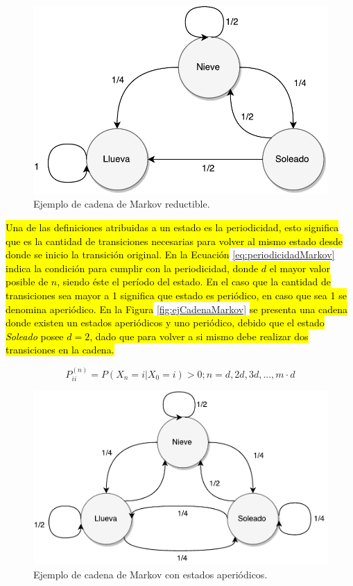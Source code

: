 \begin{figure}[ht!]
	\centering
	\includegraphics[scale=0.5]{images/EjCadenaMarkov-Reductible.pdf}
	\caption{Ejemplo de cadena de Markov reductible.}
	\label{fig:ejCadenaMarkov-Reductible}
\end{figure}

\hl{Una de las definiciones atribuidas a un estado es la periodicidad, esto significa que es la cantidad de transiciones necesarias para volver al mismo estado desde donde se inicio la transición original. En la Ecuación} \ref{eq:periodicidadMarkov} \hl{indica la condición para cumplir con la periodicidad, donde $d$ el mayor valor posible de $n$, siendo éste el período del estado. En el caso que la cantidad de transiciones sea mayor a 1 significa que estado es periódico, en caso que sea 1 se denomina aperiódico. En la Figura} \ref{fig:ejCadenaMarkov} \hl{se presenta una cadena donde existen un estados aperiódicos y uno periódico, debido que el estado \textit{Soleado} posee $d=2$, dado que para volver a si mismo debe realizar dos transiciones en la cadena.}

\begin{equation} \label{eq:periodicidadMarkov}
	P_{ii}^{(n)} = P(X_n = i | X_0 = i) > 0 ; n = {d,2d,3d,..., m·d}
\end{equation}

\begin{figure}[ht!]
	\centering
	\includegraphics[scale=0.5]{images/EjCadenaMarkov-Aperiodica.pdf}
	\caption{Ejemplo de cadena de Markov con estados aperiódicos.}
	\label{fig:ejCadenaMarkov-Aperiodica}
\end{figure}

